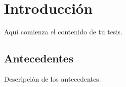 \chapter{Introducción}
Aquí comienza el contenido de tu tesis.\textcite{example}

\section{Antecedentes}
Descripción de los antecedentes.


